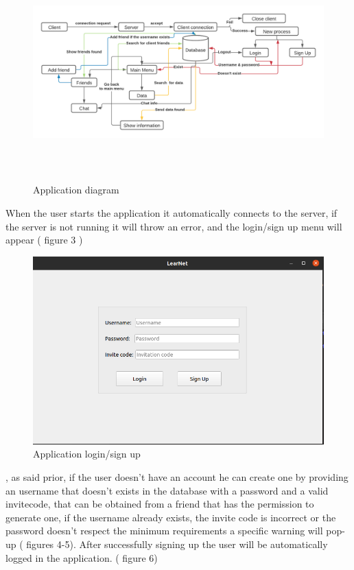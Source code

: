 \documentclass[runningheads]{llncs}
\begin{document}
\begin{figure}[H]
\includegraphics[width=6.6in, height=3.3in]{images/application.png}
\caption{Application diagram}
\end{figure}
\newpage
\par When the user starts the application it automatically connects to the server, if the server is not running it will throw an error, and the login/sign up menu will appear ( figure 3 )
\begin{figure}[H]
\includegraphics[width=\textwidth,height=\textheight,keepaspectratio]{images/login-signup.png}
\caption{Application login/sign up}
\end{figure}
, as said prior, if the user doesn't have an account he can create one by providing an username that doesn't exists in the database with a password and a valid invitecode, that can be obtained from a friend that has the permission to generate one, if the username already exists, the invite code is incorrect or the password doesn't respect the minimum requirements a specific warning will pop-up ( figures 4-5). After successfully signing up the user will be automatically logged in the application. ( figure 6)
\end{document}
